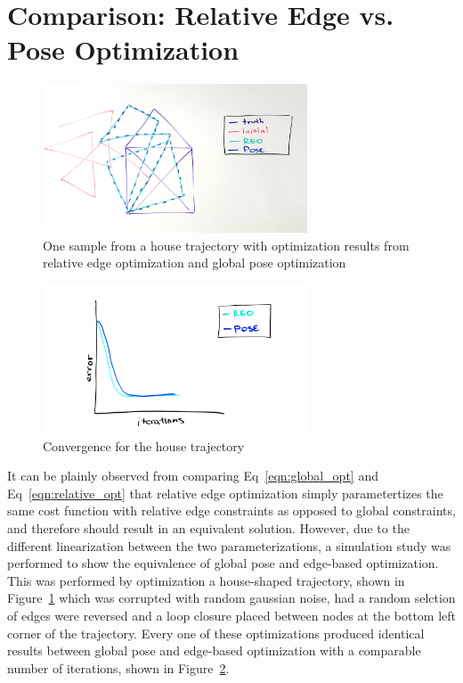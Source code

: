 
\section{Comparison: Relative Edge vs. Pose Optimization}

\begin{figure}
  \includegraphics[width=0.7\textwidth]{figures/house_trajectory.jpg}
  \caption{One sample from a house trajectory with optimization results from relative edge optimization and global pose optimization}
  \label{fig:house_trajectory}
\end{figure}

\begin{figure}
  \includegraphics[width=0.7\textwidth]{figures/convergence_comparison_house.jpg}
  \caption{Convergence for the house trajectory}
  \label{fig:convergence_house}
\end{figure}

It can be plainly observed from comparing Eq~\ref{eqn:global_opt} and Eq~\ref{eqn:relative_opt} that relative edge optimization simply parametertizes the same cost function with relative edge constraints as opposed to global constraints, and therefore should result in an equivalent solution.  However, due to the different linearization between the two parameterizations, a simulation study was performed to show the equivalence of global pose and edge-based optimization. This was performed by optimization a house-shaped trajectory, shown in Figure~\ref{fig:house_trajectory} which was corrupted with random gaussian noise, had a random selction of edges were reversed and a loop closure placed between nodes at the bottom left corner of the trajectory. Every one of these optimizations produced identical results between global pose and edge-based optimization with a comparable number of iterations, shown in Figure~\ref{fig:convergence_house}.


